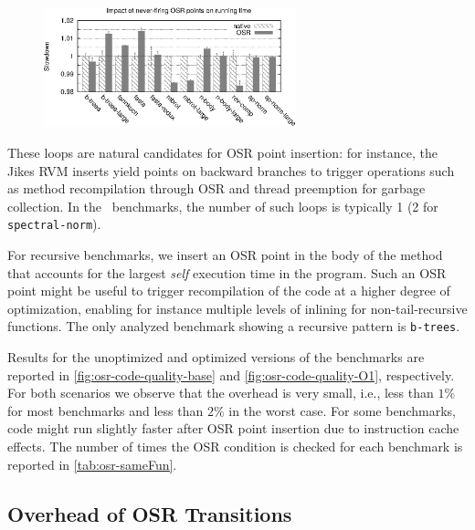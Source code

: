 \ifdefined\noauthorea
\begin{figure}[t]
\begin{center}
\includegraphics[width=0.65\textwidth]{figures/osr-code-quality-O1/osr-code-quality-O1.eps}
\caption{\protect}
\end{center}
\end{figure}
\fi

These loops are natural candidates for OSR point insertion: for instance, the Jikes RVM inserts yield points on backward branches to trigger operations such as method recompilation through OSR and thread preemption for garbage collection. In the \shootout\ benchmarks, the number of such loops is typically 1 (2 for {\tt spectral-norm}).

For recursive benchmarks, we insert an OSR point in the body of the method that accounts for the largest {\em self} execution time in the program. Such an OSR point might be useful to trigger recompilation of the code at a higher degree of optimization, enabling for instance multiple levels of inlining for non-tail-recursive functions. The only analyzed benchmark showing a recursive pattern is {\tt b-trees}.

Results for the unoptimized and optimized versions of the benchmarks are reported in \myfigure\ref{fig:osr-code-quality-base} and \myfigure\ref{fig:osr-code-quality-O1}, respectively. For both scenarios we observe that the overhead is very small, i.e., less than $1\%$ for most benchmarks and less than $2\%$ in the worst case. For some benchmarks, code might run slightly faster after OSR point insertion due to instruction cache effects.
The number of times the OSR condition is checked for each benchmark is
reported in \mytable\ref{tab:osr-sameFun}.

\subsection{Overhead of OSR Transitions}

